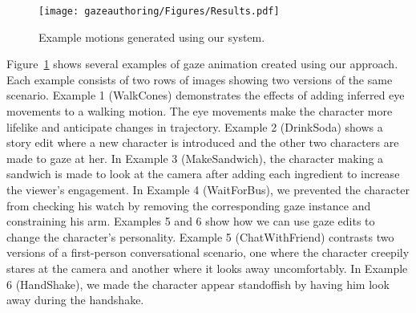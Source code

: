 \begin{figure}
\centering
\texttt{[image: gazeauthoring/Figures/Results.pdf]}
\caption{Example motions generated using our system.}
\label{fig:GazeEditResults}
\end{figure}

Figure~\ref{fig:GazeEditResults} shows several examples of gaze animation created using our approach. Each example consists of two rows of images showing two versions of the same scenario. Example 1 (WalkCones) demonstrates the effects of adding inferred eye movements to a walking motion. The eye movements make the character more lifelike and anticipate changes in trajectory. Example 2 (DrinkSoda) shows a story edit where a new character is introduced and the other two characters are made to gaze at her. In Example 3 (MakeSandwich), the character making a sandwich is made to look at the camera after adding each ingredient to increase the viewer's engagement. In Example 4 (WaitForBus), we prevented the character from checking his watch by removing the corresponding gaze instance and constraining his arm. Examples 5 and 6 show how we can use gaze edits to change the character's personality. Example 5 (ChatWithFriend) contrasts two versions of a first-person conversational scenario, one where the character creepily stares at the camera and another where it looks away uncomfortably. In Example 6 (HandShake), we made the character appear standoffish by having him look away during the handshake. 